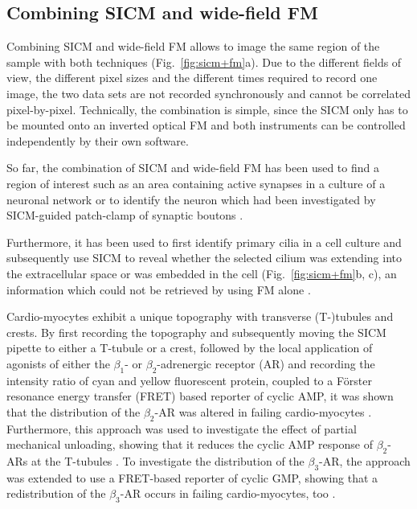 
\subsection{Combining SICM and wide-field FM}
\label{sec:SICM+widefield}
Combining SICM and wide-field FM allows to image the same region of the sample
with both techniques (Fig.~\ref{fig:sicm+fm}a). Due to the different fields of
view, the different pixel sizes and the different times required to record one
image, the two data sets are not recorded synchronously and cannot be
correlated pixel-by-pixel. Technically, the combination is simple, since
the SICM only has to be mounted onto an inverted optical FM and both
instruments can be controlled independently by their own software.

So far, the combination of SICM and wide-field FM has been used to find a
region of interest such as an area containing active synapses in a culture of
a neuronal network \cite{Scheenen2015} or to
identify the neuron which had been investigated by SICM-guided patch-clamp of
synaptic boutons \cite{Novak2013}.

Furthermore, it has been used to first identify primary cilia in a cell
culture and subsequently use SICM to reveal whether the selected cilium was
extending into the extracellular space or was embedded in the cell
(Fig.~\ref{fig:sicm+fm}b, c), an
information which could not be retrieved by using FM alone \cite{Zhou2018}.

Cardio-myocytes exhibit a unique topography with transverse (T-)tubules and
crests. By first recording the topography
and subsequently moving the SICM pipette to either a T-tubule or a crest,
followed by the local application of agonists of either the $\beta_1$- or
$\beta_2$-adrenergic receptor (AR) and recording the intensity ratio of cyan
and yellow fluorescent protein, coupled to a Förster resonance energy transfer
(FRET) based reporter of cyclic AMP, it was
shown that the distribution of the $\beta_2$-AR was altered in failing
cardio-myocytes \cite{Nikolaev2010}. Furthermore, this approach was used to
investigate the effect of partial mechanical unloading, showing that it
reduces the cyclic AMP response of $\beta_2$-ARs at the T-tubules
\cite{Wright2018}. To investigate the distribution of the $\beta_3$-AR, the
approach was extended to use a FRET-based reporter of cyclic GMP, showing that
a redistribution of the $\beta_3$-AR occurs in failing cardio-myocytes, too
\cite{Schobesberger2020}.



